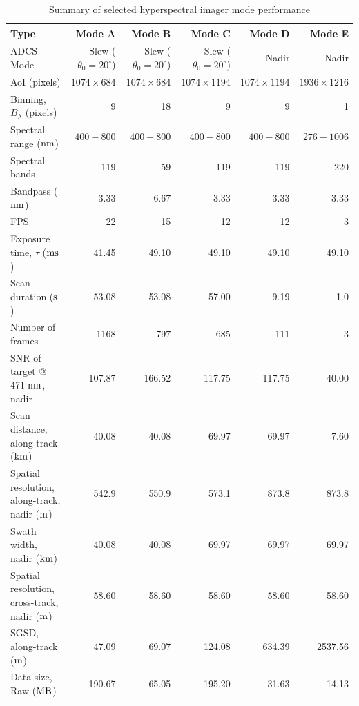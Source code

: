 \begin{table}[htbp]
	\caption{Summary of selected hyperspectral imager mode performance}
	\label{tab:data-types}
	\centering
	\begin{tabular}{l r r r r r}
        Type &	Mode A & Mode B & Mode C & Mode D & Mode E \\ %
        \hline
        ADCS Mode &	Slew ($\theta_0=20^{\circ}$) & Slew ($\theta_0=20^{\circ}$) & Slew ($\theta_0=20^{\circ}$) & Nadir & Nadir \\ %
        AoI (pixels) &	$1074\times684$ & $1074\times684$ & $1074\times1194$ & $1074\times1194$ & $1936\times1216$\\ %
        Binning, $B_\lambda$ (pixels) &	9 & 18 & 9 & 9 & 1 \\ %
        Spectral range ($\rm{nm}$) & $400-800$ & $400-800$ & $400-800$ & $400-800$ & $276-1006$ \\ %
        Spectral bands & 119 & 59 & 119 & 119 & 220 \\ %
        Bandpass ($\rm{nm}$) & 3.33 & 6.67 & 3.33 & 3.33 & 3.33 \\ %
        FPS & 22 & 15 & 12 & 12 & 3 \\ %
        Exposure time, $\tau$ ($\rm{ms}$) &	41.45 & 49.10 & 49.10 & 49.10 &	49.10 \\ %
        Scan duration ($\rm{s}$) & 53.08 & 53.08 & 57.00 & 9.19 & 1.0 \\ %
        Number of frames & 1168 & 797 & 685 & 111 & 3 \\
        SNR of target @$471 \hspace{3pt} \rm{nm}$, nadir & 107.87 & 166.52 & 117.75 & 117.75 & 40.00 \\
        Scan distance, along-track ($\rm{km}$) & 40.08 & 40.08 & 69.97 & 69.97 & 7.60  \\ %
        Spatial resolution, along-track, nadir ($\rm{m}$) & 542.9 & 550.9 & 573.1 & 873.8 & 873.8  \\
        Swath width, nadir ($\rm{km}$) & 40.08 & 40.08 & 69.97 & 69.97 & 69.97 \\ %
        Spatial resolution, cross-track, nadir ($\rm{m}$) & 58.60	& 58.60 & 58.60 & 58.60 & 58.60 \\
        SGSD, along-track ($\rm{m}$) & 47.09 & 69.07 & 124.08 & 634.39 & 2537.56 \\
        Data size, Raw ($\rm{MB}$) & 190.67 & 65.05 & 195.20 & 31.63 & 14.13 \\

\end{tabular}
\end{table}
